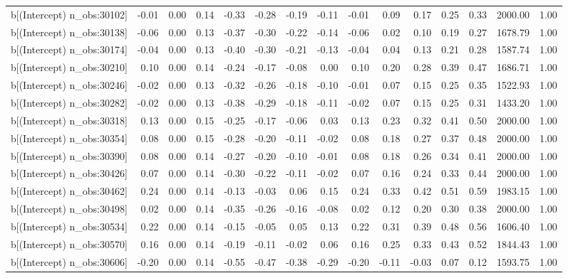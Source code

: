 \begin{table}[ht]
\begin{tabular}{rrrrrrrrrrrrrrr}
  b[(Intercept) n\_obs:30102] & -0.01 & 0.00 & 0.14 & -0.33 & -0.28 & -0.19 & -0.11 & -0.01 & 0.09 & 0.17 & 0.25 & 0.33 & 2000.00 & 1.00 \\ 
  b[(Intercept) n\_obs:30138] & -0.06 & 0.00 & 0.13 & -0.37 & -0.30 & -0.22 & -0.14 & -0.06 & 0.02 & 0.10 & 0.19 & 0.27 & 1678.79 & 1.00 \\ 
  b[(Intercept) n\_obs:30174] & -0.04 & 0.00 & 0.13 & -0.40 & -0.30 & -0.21 & -0.13 & -0.04 & 0.04 & 0.13 & 0.21 & 0.28 & 1587.74 & 1.00 \\ 
  b[(Intercept) n\_obs:30210] & 0.10 & 0.00 & 0.14 & -0.24 & -0.17 & -0.08 & 0.00 & 0.10 & 0.20 & 0.28 & 0.39 & 0.47 & 1686.71 & 1.00 \\ 
  b[(Intercept) n\_obs:30246] & -0.02 & 0.00 & 0.13 & -0.32 & -0.26 & -0.18 & -0.10 & -0.01 & 0.07 & 0.15 & 0.25 & 0.35 & 1522.93 & 1.00 \\ 
  b[(Intercept) n\_obs:30282] & -0.02 & 0.00 & 0.13 & -0.38 & -0.29 & -0.18 & -0.11 & -0.02 & 0.07 & 0.15 & 0.25 & 0.31 & 1433.20 & 1.00 \\ 
  b[(Intercept) n\_obs:30318] & 0.13 & 0.00 & 0.15 & -0.25 & -0.17 & -0.06 & 0.03 & 0.13 & 0.23 & 0.32 & 0.41 & 0.50 & 2000.00 & 1.00 \\ 
  b[(Intercept) n\_obs:30354] & 0.08 & 0.00 & 0.15 & -0.28 & -0.20 & -0.11 & -0.02 & 0.08 & 0.18 & 0.27 & 0.37 & 0.48 & 2000.00 & 1.00 \\ 
  b[(Intercept) n\_obs:30390] & 0.08 & 0.00 & 0.14 & -0.27 & -0.20 & -0.10 & -0.01 & 0.08 & 0.18 & 0.26 & 0.34 & 0.41 & 2000.00 & 1.00 \\ 
  b[(Intercept) n\_obs:30426] & 0.07 & 0.00 & 0.14 & -0.30 & -0.22 & -0.11 & -0.02 & 0.07 & 0.16 & 0.24 & 0.33 & 0.44 & 2000.00 & 1.00 \\ 
  b[(Intercept) n\_obs:30462] & 0.24 & 0.00 & 0.14 & -0.13 & -0.03 & 0.06 & 0.15 & 0.24 & 0.33 & 0.42 & 0.51 & 0.59 & 1983.15 & 1.00 \\ 
  b[(Intercept) n\_obs:30498] & 0.02 & 0.00 & 0.14 & -0.35 & -0.26 & -0.16 & -0.08 & 0.02 & 0.12 & 0.20 & 0.30 & 0.38 & 2000.00 & 1.00 \\ 
  b[(Intercept) n\_obs:30534] & 0.22 & 0.00 & 0.14 & -0.15 & -0.05 & 0.05 & 0.13 & 0.22 & 0.31 & 0.39 & 0.48 & 0.56 & 1606.40 & 1.00 \\ 
  b[(Intercept) n\_obs:30570] & 0.16 & 0.00 & 0.14 & -0.19 & -0.11 & -0.02 & 0.06 & 0.16 & 0.25 & 0.33 & 0.43 & 0.52 & 1844.43 & 1.00 \\ 
  b[(Intercept) n\_obs:30606] & -0.20 & 0.00 & 0.14 & -0.55 & -0.47 & -0.38 & -0.29 & -0.20 & -0.11 & -0.03 & 0.07 & 0.12 & 1593.75 & 1.00 \\ 

\end{tabular}
\end{table}
